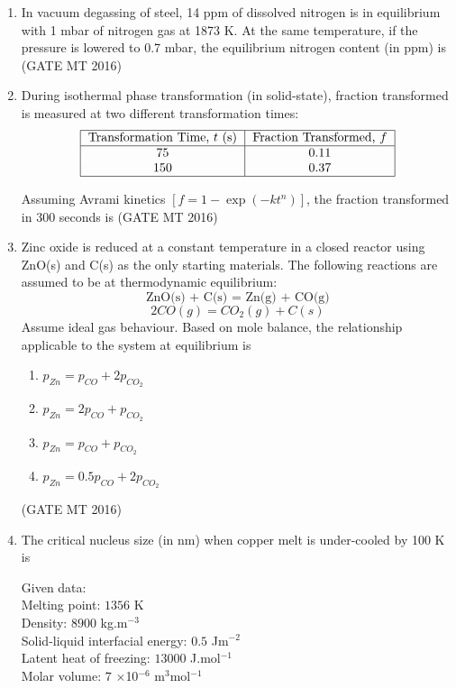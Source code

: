 \documentclass[journal, 11pt, onecolumn]{IEEEtran}
\theoremstyle{remark}
\begin{document}
\begin{enumerate}
\item In vacuum degassing of steel, 14 ppm of dissolved nitrogen is in equilibrium with 1 mbar of nitrogen gas at 1873 K. At the same temperature, if the pressure is lowered to 0.7 mbar, the equilibrium nitrogen content (in ppm) is 
\hfill(GATE MT 2016)

\item During isothermal phase transformation (in solid-state), fraction transformed is measured at two different transformation times:
\begin{align}
    \begin{tabular}{|c|c|}
\hline
Transformation Time, $t$ (s) & Fraction Transformed, $f$ \\
\hline
75 & 0.11 \\
150 & 0.37 \\
\hline
\end{tabular}
\end{align}

Assuming Avrami kinetics $[f = 1 - \exp(-kt^n)]$, the fraction transformed in 300 seconds is 
\hfill(GATE MT 2016)

\item Zinc oxide is reduced at a constant temperature in a closed reactor using ZnO(s) and C(s) as the only starting materials. The following reactions are assumed to be at thermodynamic equilibrium:
\[
\text{ZnO(s) + C(s) = Zn(g) + CO(g)}
\]
\[
2CO(g) = CO_2(g) + C(s)
\]
Assume ideal gas behaviour. Based on mole balance, the relationship applicable to the system at equilibrium is
\begin{enumerate}
\item $p_{Zn} = p_{CO} + 2p_{CO_2}$
\item $p_{Zn} = 2p_{CO} + p_{CO_2}$
\item $p_{Zn} = p_{CO} + p_{CO_2}$
\item $p_{Zn} = 0.5p_{CO} + 2p_{CO_2}$
\end{enumerate}
\hfill(GATE MT 2016)

\item The critical nucleus size (in nm) when copper melt is under-cooled by 100 K is

Given data:\\  
Melting point: $1356$ K  \\
Density: $8900$ kg.m$^{-3}$  \\
Solid-liquid interfacial energy: $0.5$ Jm$^{-2}$ \\ 
Latent heat of freezing: $13000$ J.mol$^{-1}$  \\
Molar volume: $7$ $\times$10$^{-6}$ m$^{3}$mol$^{-1}$  


\end{enumerate}
\end{document}
